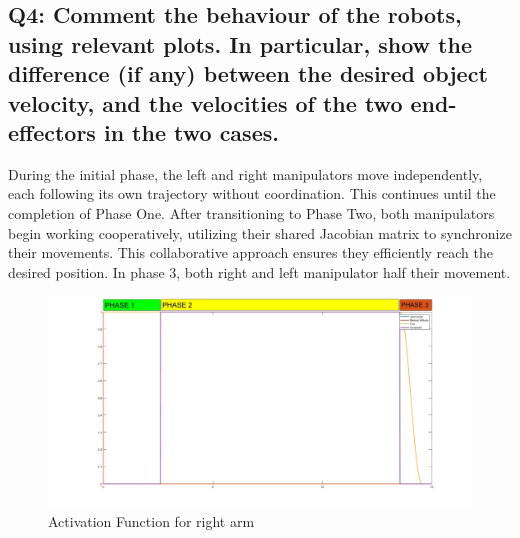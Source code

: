 \documentclass{article}
\begin{document}
\subsection{Q4: Comment the behaviour of the robots, using relevant plots. In particular, show the difference (if any) between the desired object velocity, and the velocities of the two end-effectors in the two cases.}
During the initial phase, the left and right manipulators move independently, each following its own trajectory without coordination. This continues until the completion of Phase One. After transitioning to Phase Two, both manipulators begin working cooperatively, utilizing their shared Jacobian matrix to synchronize their movements. This collaborative approach ensures they efficiently reach the desired position.
In phase 3, both right and left manipulator half their movement.
\begin{figure}[h]
	\centering
	\includegraphics[width=1\textwidth]{imgs/ex2/activation right.jpg}
	\caption{\label{fig:1} Activation Function for right arm}
\end{figure}
\end{document}
